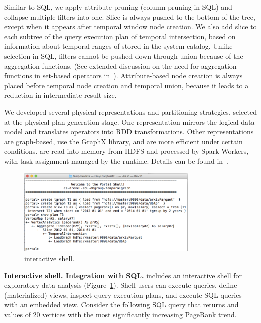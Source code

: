 Similar to SQL, we apply attribute pruning (column pruning in SQL) and
collapse multiple filters into one.  Slice is always pushed to the
bottom of the tree, except when it appears after temporal window node
creation.  We also add slice to each subtree of the query execution
plan of temporal intersection, based on information about temporal
ranges of \tgs stored in the system catalog.  Unlike selection in SQL, filters
cannot be pushed down through union because of the aggregation
functions.  (See extended discussion on the need for aggregation
functions in set-based operators in~\cite{PortalarXiv2016}).
Attribute-based node creation is always placed before temporal node
creation and temporal union, because it leads to a reduction in
intermediate result size.

We developed several physical representations and partitioning
strategies, selected at the physical plan generation stage.  One
representation mirrors the logical data model and translates \tga
operators into RDD transformations.  Other representations are
graph-based, use the GraphX library, and are more efficient under
certain conditions.  \tgs are read into memory from HDFS and processed
by Spark Workers, with task assignment managed by the runtime.
Details can be found in~\cite{PortalarXiv2016}.

\begin{figure}[t]
\centering
\includegraphics[width=3.4in]{figs/shell.png}
\vspace{-0.5cm}
\caption{\sys interactive shell.}
\vspace{-0.5cm}
\label{fig:shell}
\end{figure}

{\bf Interactive shell. Integration with SQL.}  \sys includes an
interactive shell for exploratory data analysis
(Figure~\ref{fig:shell}). Shell users can execute queries, define
(materialized) views, inspect query execution plans, and execute SQL
queries with an embedded \ql view. Consider the following SQL query
that returns  and  values of 20 vertices with the
most significantly increasing PageRank trend.

